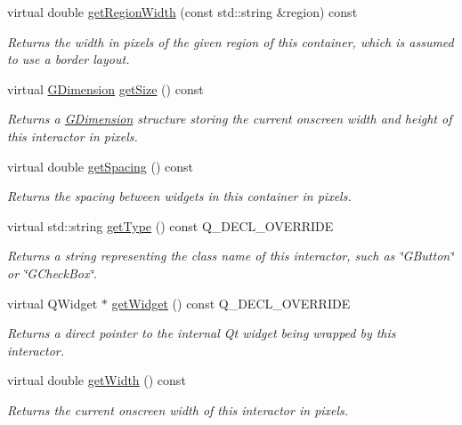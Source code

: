\begin{DoxyCompactItemize}
virtual double \mbox{\hyperlink{classGContainer_ab169dab454fc90f1c845b91b4e1a8a14}{get\+Region\+Width}} (const std\+::string \&region) const
\begin{DoxyCompactList}\small\item\em Returns the width in pixels of the given region of this container, which is assumed to use a border layout. \end{DoxyCompactList}\item 
virtual \mbox{\hyperlink{classGDimension}{G\+Dimension}} \mbox{\hyperlink{classGInteractor_a7b4eec96a2bdc6420695d5796a78eea9}{get\+Size}} () const
\begin{DoxyCompactList}\small\item\em Returns a \mbox{\hyperlink{classGDimension}{G\+Dimension}} structure storing the current onscreen width and height of this interactor in pixels. \end{DoxyCompactList}\item 
virtual double \mbox{\hyperlink{classGContainer_a9a7e859eeff5cc7de46d65b9be7afc3c}{get\+Spacing}} () const
\begin{DoxyCompactList}\small\item\em Returns the spacing between widgets in this container in pixels. \end{DoxyCompactList}\item 
virtual std\+::string \mbox{\hyperlink{classGContainer_a9896d58fcfebbf1025aeeb5b8b9ede80}{get\+Type}} () const Q\+\_\+\+D\+E\+C\+L\+\_\+\+O\+V\+E\+R\+R\+I\+DE
\begin{DoxyCompactList}\small\item\em Returns a string representing the class name of this interactor, such as \char`\"{}\+G\+Button\char`\"{} or \char`\"{}\+G\+Check\+Box\char`\"{}. \end{DoxyCompactList}\item 
virtual Q\+Widget $\ast$ \mbox{\hyperlink{classGContainer_a326ee51b5561f807df7b29a1c101f7fd}{get\+Widget}} () const Q\+\_\+\+D\+E\+C\+L\+\_\+\+O\+V\+E\+R\+R\+I\+DE
\begin{DoxyCompactList}\small\item\em Returns a direct pointer to the internal Qt widget being wrapped by this interactor. \end{DoxyCompactList}\item 
virtual double \mbox{\hyperlink{classGInteractor_a0ed2965abd4f5701d2cadf71239faf19}{get\+Width}} () const
\begin{DoxyCompactList}\small\item\em Returns the current onscreen width of this interactor in pixels. \end{DoxyCompactList}\item 

\end{DoxyCompactItemize}
